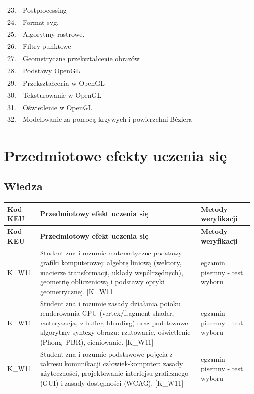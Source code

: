 \documentclass[12pt, a4paper]{article}
\newcommand{\thdrule}{\noalign{\global\setlength{\extrarowheight}{0pt}}}
\newcommand{\thdend}{\noalign{\global\setlength{\extrarowheight}{3pt}}}
\begin{document}
{\begin{longtable}{m{1.5cm}m{14.5cm}}
  \rowcolor{tableRowLight} 23. & Postprocessing \\
  \rowcolor{tableRowAlt} 24. & Format svg. \\
  \rowcolor{tableRowLight} 25. & Algorytmy rastrowe. \\
  \rowcolor{tableRowAlt} 26. & Filtry punktowe \\
  \rowcolor{tableRowLight} 27. & Geometryczne przekształcenie obrazów \\
  \rowcolor{tableRowAlt} 28. & Podstawy OpenGL \\
  \rowcolor{tableRowLight} 29. & Przekształcenia w OpenGL \\
  \rowcolor{tableRowAlt} 30. & Teksturowanie w OpenGL \\
  \rowcolor{tableRowLight} 31. & Oświetlenie w OpenGL \\
  \rowcolor{tableRowAlt} 32. & Modelowanie za pomocą krzywych i powierzchni Béziera \\
\bottomrule
\end{longtable}}

\section{Przedmiotowe efekty uczenia się}

\subsection*{Wiedza}
{\scriptsize
\begin{longtable}{m{1.6cm}m{9.0cm}m{4.2cm}}
\thdrule\toprule
\rowcolor{pjatkRed} {\color{white}\footnotesize\textbf{\vphantom{Ag}Kod KEU}} & {\color{white}\footnotesize\textbf{\vphantom{Ag}Przedmiotowy efekt uczenia się}} & {\color{white}\footnotesize\textbf{\vphantom{Ag}Metody weryfikacji}} \\
\midrule\thdend
\endfirsthead
\thdrule\toprule
\rowcolor{pjatkRed} {\color{white}\footnotesize\textbf{\vphantom{Ag}Kod KEU}} & {\color{white}\footnotesize\textbf{\vphantom{Ag}Przedmiotowy efekt uczenia się}} & {\color{white}\footnotesize\textbf{\vphantom{Ag}Metody weryfikacji}} \\
\midrule\thdend
\endhead
  \rowcolor{tableRowLight} K\_W11 & Student zna i rozumie matematyczne podstawy grafiki komputerowej: algebrę liniową (wektory, macierze transformacji, układy współrzędnych), geometrię obliczeniową i podstawy optyki geometrycznej. {[}K\_W11{]} & egzamin pisemny - test wyboru \\
  \rowcolor{tableRowAlt} K\_W11 & Student zna i rozumie zasady działania potoku renderowania GPU (vertex/fragment shader, rasteryzacja, z-buffer, blending) oraz podstawowe algorytmy syntezy obrazu: rzutowanie, oświetlenie (Phong, PBR), cieniowanie. {[}K\_W11{]} & egzamin pisemny - test wyboru \\
  \rowcolor{tableRowLight} K\_W11 & Student zna i rozumie podstawowe pojęcia z zakresu komunikacji człowiek-komputer: zasady użyteczności, projektowanie interfejsu graficznego (GUI) i zasady dostępności (WCAG). {[}K\_W11{]} & egzamin pisemny - test wyboru \\
\bottomrule
\end{longtable}}
\end{document}
